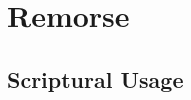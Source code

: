\section{Remorse}
	\label{REMORSE}
	





\subsection{Scriptural Usage} %
	\label{REMORSE-SCRIPTURES}

	
	
